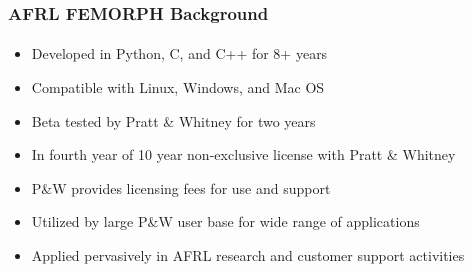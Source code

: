 \documentclass[t]{beamer}
\begin{document}
\begin{frame}
  \frametitle{AFRL FEMORPH Background}
  \framesubtitle{}
  
  \begin{itemize}
  \item Developed in Python, C, and C++ for 8+ years
  \item Compatible with Linux, Windows, and Mac OS
  \item Beta tested by Pratt \& Whitney for two years
  \item In fourth year of 10 year non-exclusive license with Pratt \& Whitney
  \item P\&W provides licensing fees for use and support
  \item Utilized by large P\&W user base for wide range of applications
  \item Applied pervasively in AFRL research and customer support activities
  \end{itemize}

\end{frame}







\end{document}
